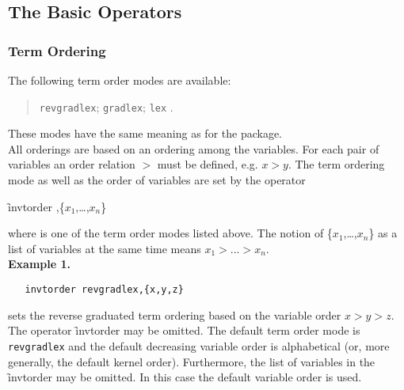 \subsection{The Basic Operators}
\subsubsection{Term Ordering}
\hypertarget{operator:INVTORDER}{}
The following term order modes are available:
\begin{quote}
  \texttt{revgradlex}; \texttt{gradlex}; \texttt{lex} .
\end{quote}
These modes have the same meaning as for the  package.\\
All orderings are based on an ordering among the variables.
For each pair of variables an order relation $>$ must be defined,
e.g. $x>y$. The term ordering mode as well as the order of variables
are set by the operator
\begin{syntax}
  \f{invtorder} ,\{$x_{1}$,\ldots,$x_{n}$\}
\end{syntax}
where  is one of the term order modes listed above.
The notion of \{$x_1$,\ldots,$x_n$\} as a list of variables
at the same time means $x_1>...>x_n$.\\[0.1cm]
\textbf{Example 1.}
\begin{verbatim}
   invtorder revgradlex,{x,y,z}
\end{verbatim}
sets the reverse graduated term ordering based on the variable
order $x>y>z$.\\
The operator \f{invtorder} may be omitted. The default term order mode
is \texttt{revgradlex} and the default decreasing variable order is
alphabetical (or, more generally, the default \REDUCE kernel order).
Furthermore, the list of variables in the \f{invtorder} may be omitted.
In this case the default variable order is used.

